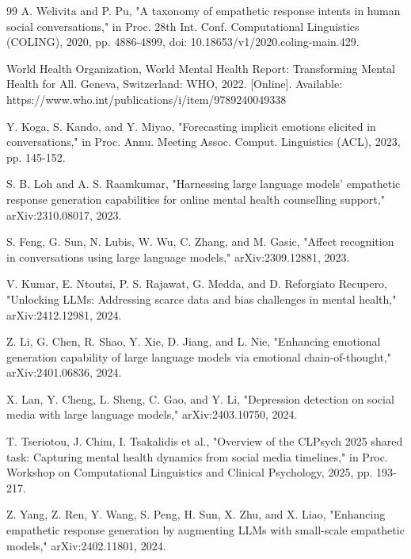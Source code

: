 \begin{thebibliography}{99}
A. Welivita and P. Pu, "A taxonomy of empathetic response intents in human social conversations," in Proc. 28th Int. Conf. Computational Linguistics (COLING), 2020, pp. 4886-4899, doi: 10.18653/v1/2020.coling-main.429.

World Health Organization, World Mental Health Report: Transforming Mental Health for All. Geneva, Switzerland: WHO, 2022. [Online]. Available: https://www.who.int/publications/i/item/9789240049338

Y. Koga, S. Kando, and Y. Miyao, "Forecasting implicit emotions elicited in conversations," in Proc. Annu. Meeting Assoc. Comput. Linguistics (ACL), 2023, pp. 145-152.

S. B. Loh and A. S. Raamkumar, "Harnessing large language models' empathetic response generation capabilities for online mental health counselling support," arXiv:2310.08017, 2023.

S. Feng, G. Sun, N. Lubis, W. Wu, C. Zhang, and M. Gasic, "Affect recognition in conversations using large language models," arXiv:2309.12881, 2023.

V. Kumar, E. Ntoutsi, P. S. Rajawat, G. Medda, and D. Reforgiato Recupero, "Unlocking LLMs: Addressing scarce data and bias challenges in mental health," arXiv:2412.12981, 2024.

Z. Li, G. Chen, R. Shao, Y. Xie, D. Jiang, and L. Nie, "Enhancing emotional generation capability of large language models via emotional chain-of-thought," arXiv:2401.06836, 2024.

X. Lan, Y. Cheng, L. Sheng, C. Gao, and Y. Li, "Depression detection on social media with large language models," arXiv:2403.10750, 2024.

T. Tseriotou, J. Chim, I. Tsakalidis et al., "Overview of the CLPsych 2025 shared task: Capturing mental health dynamics from social media timelines," in Proc. Workshop on Computational Linguistics and Clinical Psychology, 2025, pp. 193-217.

Z. Yang, Z. Ren, Y. Wang, S. Peng, H. Sun, X. Zhu, and X. Liao, "Enhancing empathetic response generation by augmenting LLMs with small-scale empathetic models," arXiv:2402.11801, 2024.

\end{thebibliography}